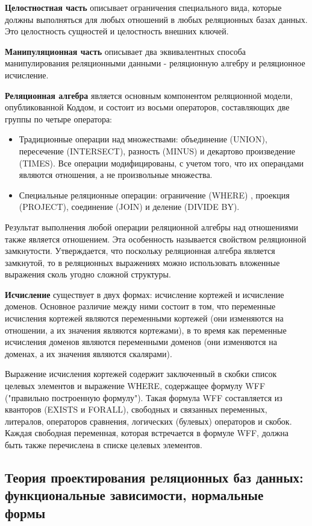 \textbf{Целостностная часть} описывает ограничения специального вида, которые должны выполняться для любых отношений в любых реляционных базах данных. Это целостность сущностей и целостность внешних ключей.

\textbf{Манипуляционная часть} описывает два эквивалентных способа манипулирования реляционными данными - реляционную алгебру и реляционное исчисление.

\textbf{Реляционная алгебра} является основным компонентом реляционной модели, опубликованной Коддом, и состоит из восьми операторов, составляющих две группы по четыре оператора:
\begin{itemize}
	\item Традиционные операции над множествами: объединение (UNION), пересечение (INTERSECT), разность (MINUS) и декартово произведение (TIMES). Все операции модифицированы, с учетом того, что их операндами являются отношения, а не произвольные множества.
	\item Специальные реляционные операции: ограничение (WHERE) , проекция (PROJECT), соединение (JOIN) и деление (DIVIDE BY).
\end{itemize}

Результат выполнения любой операции реляционной алгебры над отношениями также является отношением. Эта особенность называется свойством реляционной замкнутости. Утверждается, что поскольку реляционная алгебра является замкнутой, то в реляционных выражениях можно использовать вложенные выражения сколь угодно сложной структуры.

\textbf{Исчисление} существует в двух формах: исчисление кортежей и исчисление доменов. Основное различие между ними состоит в том, что переменные исчисления кортежей являются переменными кортежей (они изменяются на отношении, а их значения являются кортежами), в то время как переменные исчисления доменов являются переменными доменов (они изменяются на доменах, а их значения являются скалярами).

Выражение исчисления кортежей содержит заключенный в скобки список целевых элементов и выражение WНERE, содержащее формулу WFF ("правильно построенную формулу"). Такая формула WFF составляется из кванторов (EXISTS и FORALL), свободных и связанных переменных, литералов, операторов сравнения, логических (булевых) операторов и скобок. Каждая свободная переменная, которая встречается в формуле WFF, должна быть также перечислена в списке целевых элементов.

\subsection{Теория проектирования реляционных баз данных: функциональные зависимости, нормальные формы}

